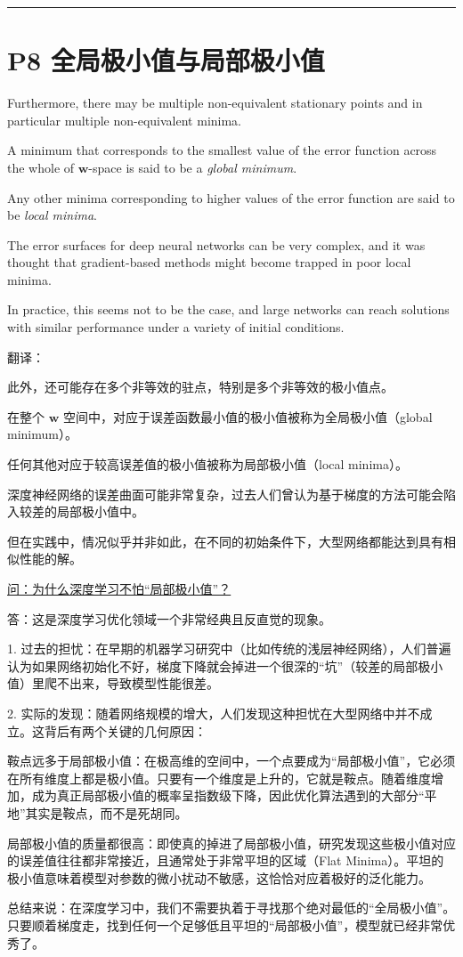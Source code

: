 \documentclass{article}
\begin{document}
\noindent\rule{\linewidth}{0.4pt}
 
\section{P8 全局极小值与局部极小值}

Furthermore, there may be multiple non-equivalent stationary points and in particular multiple non-equivalent minima. 

A minimum that corresponds to the smallest value of the error function across the whole of $\mathbf{w}$-space is said to be a \emph{global minimum}. 

Any other minima corresponding to higher values of the error function are said to be \emph{local minima}. 

The error surfaces for deep neural networks can be very complex, and it was thought that gradient-based methods might become trapped in poor local minima. 

In practice, this seems not to be the case, and large networks can reach solutions with similar performance under a variety of initial conditions.

{\color{red}
翻译：

此外，还可能存在多个非等效的驻点，特别是多个非等效的极小值点。

在整个 $\mathbf{w}$ 空间中，对应于误差函数最小值的极小值被称为全局极小值（global minimum）。

任何其他对应于较高误差值的极小值被称为局部极小值（local minima）。

深度神经网络的误差曲面可能非常复杂，过去人们曾认为基于梯度的方法可能会陷入较差的局部极小值中。

但在实践中，情况似乎并非如此，在不同的初始条件下，大型网络都能达到具有相似性能的解。
}

{\color{blue}
\underline{问：为什么深度学习不怕“局部极小值”？}

答：这是深度学习优化领域一个非常经典且反直觉的现象。

1. 过去的担忧：在早期的机器学习研究中（比如传统的浅层神经网络），人们普遍认为如果网络初始化不好，梯度下降就会掉进一个很深的“坑”（较差的局部极小值）里爬不出来，导致模型性能很差。

2. 实际的发现：随着网络规模的增大，人们发现这种担忧在大型网络中并不成立。这背后有两个关键的几何原因：

鞍点远多于局部极小值：在极高维的空间中，一个点要成为“局部极小值”，它必须在所有维度上都是极小值。只要有一个维度是上升的，它就是鞍点。随着维度增加，成为真正局部极小值的概率呈指数级下降，因此优化算法遇到的大部分“平地”其实是鞍点，而不是死胡同。

局部极小值的质量都很高：即使真的掉进了局部极小值，研究发现这些极小值对应的误差值往往都非常接近，且通常处于非常平坦的区域（Flat Minima）。平坦的极小值意味着模型对参数的微小扰动不敏感，这恰恰对应着极好的泛化能力。

总结来说：在深度学习中，我们不需要执着于寻找那个绝对最低的“全局极小值”。只要顺着梯度走，找到任何一个足够低且平坦的“局部极小值”，模型就已经非常优秀了。

}
\end{document}
